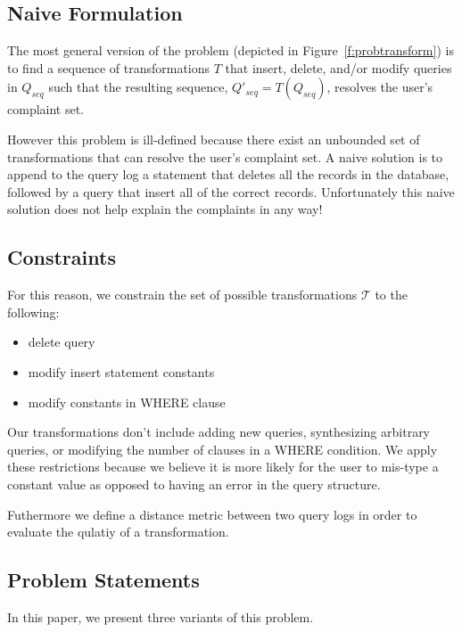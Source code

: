 \subsection{Naive Formulation}

The most general version of the problem
(depicted in Figure~\ref{f:probtransform}) is to find a sequence of
transformations $T$ that insert, delete, and/or modify queries in $Q_{seq}$ 
such that the resulting sequence, $Q'_{seq} = T(Q_{seq})$, resolves the user's complaint set. 

However this problem is ill-defined because there exist an unbounded set of transformations that
can resolve the user's complaint set.  A naive solution is to append to the query log a statement
that deletes all the records in the database, followed by a query that insert all of the correct records.
Unfortunately this naive solution does not help explain the complaints in any way!

\subsection{Constraints}

For this reason, we constrain the set of possible transformations $\mathcal{T}$ to the following:

\begin{itemize}
\item delete query
\item modify insert statement constants
\item modify constants in WHERE clause
\end{itemize}

Our transformations don't include adding new queries, synthesizing arbitrary queries, or modifying the
number of clauses in a WHERE condition.  We apply these restrictions because we believe it is more likely
for the user to mis-type a constant value as opposed to having an error in the query structure.

Futhermore we define a distance metric between two query logs in order to evaluate
the qulatiy of a transformation.



\subsection{Problem Statements}

In this paper, we present three variants of this problem.

